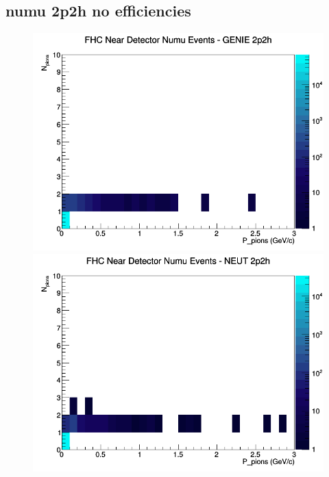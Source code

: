 \documentclass[12pt]{article}
\begin{document}
\subsection{numu 2p2h no efficiencies}
\begin{figure}[h]
\includegraphics[width=\linewidth]{N_P/nominal/pions/2p2h_FHC_ND_numu_N_P_GENIE.png}
\endminipage
{}
\includegraphics[width=\linewidth]{N_P/nominal/pions/2p2h_FHC_ND_numu_N_P_NEUT.png}
\endminipage
{}

\end{figure}
\end{document}
